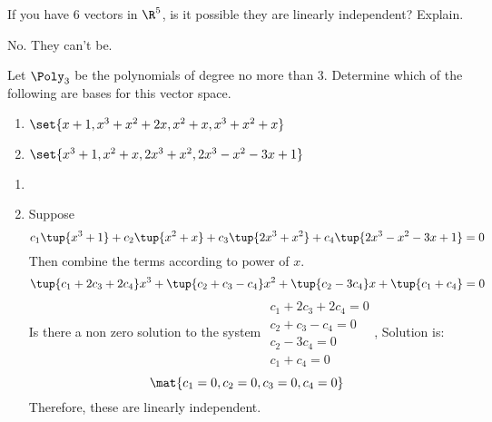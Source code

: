 \begin{enumialphparenastyle}
\begin{ex} If you have $6$ vectors in $\R^{5}$, is it possible they are
linearly independent? Explain. 
\begin{sol}
No. They can't be.
\end{sol}
\end{ex}

\begin{ex} Let $\Poly_3$ be the polynomials of degree no more than 3. Determine which
of the following are bases for this vector space.

\begin{enumerate}
\item $\set{x+1,x^{3}+x^{2}+2x,x^{2}+x,x^{3}+x^{2}+x} $

\item $\set{x^{3}+1,x^{2}+x,2x^{3}+x^{2},2x^{3}-x^{2}-3x+1} $
\end{enumerate}

\begin{sol}
\begin{enumerate}
\item 
\item
Suppose
\[
c_{1}\tup{x^{3}+1} +c_{2}\tup{x^{2}+x} +c_{3}\tup{
2x^{3}+x^{2}} +c_{4}\tup{2x^{3}-x^{2}-3x+1} =0
\]
Then combine the terms according to power of $x$.
\[
\tup{c_{1}+2c_{3}+2c_{4}} x^{3}+\tup{c_{2}+c_{3}-c_{4}}
x^{2}+\tup{c_{2}-3c_{4}} x+\tup{c_{1}+c_{4}} =0
\]
Is there a non zero solution to the system $
\begin{array}{c}
c_{1}+2c_{3}+2c_{4}=0 \\
c_{2}+c_{3}-c_{4}=0 \\
c_{2}-3c_{4}=0 \\
c_{1}+c_{4}=0
\end{array}
$, Solution is:
\[
\mat{c_{1}=0,c_{2}=0,c_{3}=0,c_{4}=0}
\]
Therefore, these are linearly independent.
\end{enumerate}
\end{sol}
\end{ex}


\end{enumialphparenastyle}
